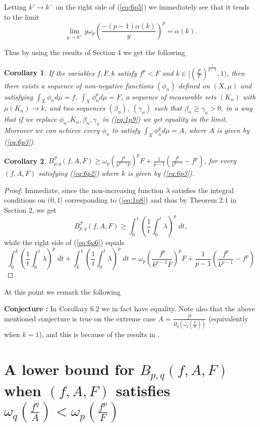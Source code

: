 \documentclass{article}
\numberwithin{equation}{section}
\newtheorem{corollary}{Corollary}[section]
\theoremstyle{definition}
\theoremstyle{remark}
\newcommand{\mc}[1]{\mathcal{#1}}
\begin{document}
Letting $k'\rightarrow k^{-}$ on the right side of (\ref{eq:6p5}) we immediately see that it tends to the limit
$$\lim_{y\rightarrow 0^+}y\omega_p(\frac{-(p-1)\alpha(k)}{y})^p= \alpha(k).$$ 

Thus by using the results of Section 4 we get the following 
\begin{corollary} \label{cor:6p1}
If the variables $f,F,k$ satisfy $f^p<F$ and 
$k\in  [(\frac{f^p}{F})^{\frac{1}{p-1}},1)$, then there exists a sequence of non-negative functions $(\phi_n)$ defined on $(X,\mu)$ and satisfying
$\int_X \phi_n d\mu=f$, $\int_X \phi^p_n d\mu=F$, a sequence of measurable sets $(K_n)$ with $\mu(K_n) \rightarrow k$, and two sequences $(\beta_n)$, $(\gamma_n)$ such that $\beta_n\geq \gamma_n >0$, in a way that if we replace $\phi_n, K_n,\beta_n, \gamma_n$ in (\ref{eq:1p9}) we get equality in the limit. Moreover we can achieve every $\phi_n$ to satisfy $\int_X \phi^q_n d\mu=A$, where $A$ is given by (\ref{eq:6p3}).
\end{corollary}

\begin{corollary} \label{cor:6p2}
$B_{p,q}^{\mc T}(f,A,F)\geq \omega_p(\frac{f^p}{k^{p-1}F})^pF + \frac{1}{p-1}(\frac{f^p}{k^{p-1}}-f^p)$, for every $(f,A,F)$ satisfying (\ref{eq:6p2}) where $k$ is given by (\ref{eq:6p3}).
\end{corollary}

\begin{proof}
Immediate, since the non-increasing function $\lambda$ satisfies the integral conditions on $(0,1]$ corresponding to (\ref{eq:1p8}) and thus by Theorem 2.1 in Section 2, we get 
\begin{equation}\label{eq:6p6}
B_{p,q}^{\mc T}(f,A,F)\geq \int_0^1 \left( \frac{1}{t} \int_0^t \lambda \right)^p \;dt, 
\end{equation}
while the right side of (\ref{eq:6p6}) equals 
$$\int_0^k \left( \frac{1}{t} \int_0^t \lambda \right)^p \;dt+\int_k^1 \left( \frac{1}{t} \int_0^t \lambda \right)^p \;dt= \omega_p(\frac{f^p}{k^{p-1}F})^pF + \frac{1}{p-1}(\frac{f^p}{k^{p-1}}-f^p) $$
\end{proof}
At this point we remark the following

{\bf{Conjecture :}} In Corollary 6.2 we in fact have equality.  
Note also that the above mentioned conjecture is true on the extreme case $A=\frac{f^q}{H_q(\omega_p(\frac{f^p}{F}))}$ (equivalently when $k=1$), and this is because of the results in \cite{DN}.

\section{A lower bound for $B_{p,q}(f,A,F)$ when $(f,A,F)$ satisfies $\omega_q \left ( \frac{f^q}{A} \right ) < \omega_p \left ( \frac{f^p}{F} \right )$} \label{sec:7}
\end{document}
